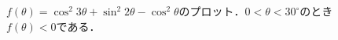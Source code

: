 \documentclass[10pt,b5paper,papersize,dvipdfmx]{jsbook}
\begin{document}
%

\begin{figure}[th] \small
  \centering
  
  \caption{$f(\theta) = \cos^2 3\theta + \sin^2 2\theta - \cos^2\theta$のプロット．$0 < \theta < 30^\circ$のとき$f(\theta) < 0$である．}
  \label{a}
\end{figure}











%
\end{document}
